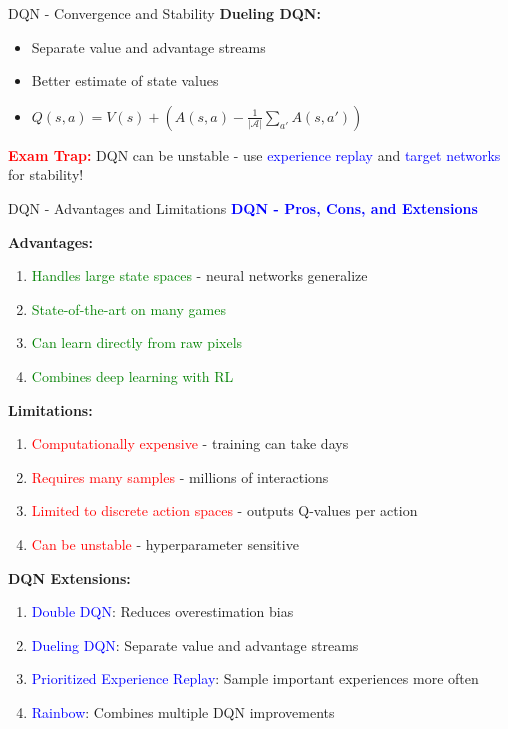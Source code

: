 \documentclass[8pt]{beamer}
\begin{document}
\begin{frame}{DQN - Convergence and Stability}
		\textbf{Dueling DQN:}
		\begin{itemize}
			\item Separate value and advantage streams
			\item Better estimate of state values
			\item $Q(s,a) = V(s) + (A(s,a) - \frac{1}{|\mathcal{A}|}\sum_{a'} A(s,a'))$
		\end{itemize}
		
		\textcolor{red}{\textbf{Exam Trap:}} DQN can be unstable - use \textcolor{blue}{experience replay} and \textcolor{blue}{target networks} for stability!
	\end{frame}
	
	\begin{frame}{DQN - Advantages and Limitations}
		\fontsize{6.5}{7.5}\selectfont
		\textcolor{blue}{\textbf{DQN - Pros, Cons, and Extensions}}
		
		\textbf{Advantages:}
		\begin{enumerate}
			\item \textcolor{green}{Handles large state spaces} - neural networks generalize
			\item \textcolor{green}{State-of-the-art on many games}
			\item \textcolor{green}{Can learn directly from raw pixels}
			\item \textcolor{green}{Combines deep learning with RL}
		\end{enumerate}
		
		\textbf{Limitations:}
		\begin{enumerate}
			\item \textcolor{red}{Computationally expensive} - training can take days
			\item \textcolor{red}{Requires many samples} - millions of interactions
			\item \textcolor{red}{Limited to discrete action spaces} - outputs Q-values per action
			\item \textcolor{red}{Can be unstable} - hyperparameter sensitive
		\end{enumerate}
		
		\textbf{DQN Extensions:}
		\begin{enumerate}
			\item \textcolor{blue}{Double DQN}: Reduces overestimation bias
			\item \textcolor{blue}{Dueling DQN}: Separate value and advantage streams
			\item \textcolor{blue}{Prioritized Experience Replay}: Sample important experiences more often
			\item \textcolor{blue}{Rainbow}: Combines multiple DQN improvements
		\end{enumerate}
		

\end{frame}
\end{document}
